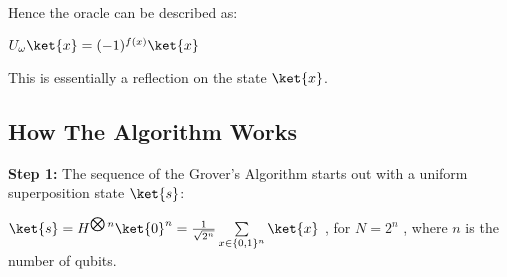 \documentclass{article}
\begin{document}
Hence the oracle can be described as:
\vspace{5mm}

\qquad $U_\omega\ket{x} = (-1)^{f(x)} \ket{x}$
\vspace{5mm}

This is essentially a reflection on the state $\ket{x}$.

\pagebreak

\subsection{How The Algorithm Works}
\vspace{5mm}

\textbf{Step 1:}
\vspace{5mm}
\noindent
The sequence of the Grover's Algorithm starts out with a uniform superposition state $\ket{s}$\cite{noauthor_grovers_nodate}:
\vspace{5mm}

\qquad $ \ket{s}= H^{\bigotimes n} \ket{0}^n = \frac{1}{\sqrt{2^n}}\sum\limits_{x \in \{0,1\}^n}\ket{x} $ , \qquad for $N = 2^n$ , where $n$ is the number of qubits.
\vspace{5mm}



\end{document}
